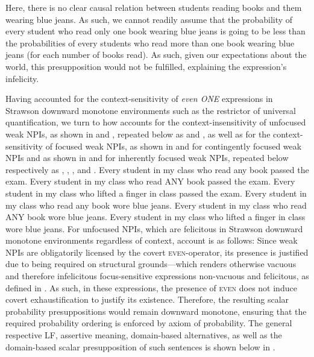 \xe
Here, there is no clear causal relation between students reading books and them wearing blue jeans. As such, we cannot readily assume that the probability of every student who read only one book wearing blue jeans is going to be less than the probabilities of every students who read more than one book wearing blue jeans (for each number of books read). As such, given our expectations about the world, this presupposition would not be fulfilled, explaining the expression's infelicity.

Having accounted for the context-sensitivity of \textit{even \MakeUppercase{one}} expressions in Strawson downward monotone environments such as the restrictor of universal quantification, we turn to how \textcite{Crnic2014-dogma} accounts for the context-insensitivity of unfocused weak NPIs, as shown in  and , repeated below as  and , as well as for the context-sensitivity of focused weak NPIs, as shown in  and  for contingently focused weak NPIs and as shown in  and  for inherently focused weak NPIs, repeated below respectively as , , , and .
\pex[nopreamble=true]\label{ex:npi-every-okay-repeat}%
\a{} Every student in my class who read any book passed the exam.
\a{} Every student in my class who read \MakeUppercase{any} book passed the exam.
\a{} Every student in my class who lifted a finger in class passed the exam.
\xe
\pex[nopreamble=true]\label{ex:npi-every-bad-repeat}%
\a{} Every student in my class who read any book wore blue jeans.
\a{}\ljudge{\#} Every student in my class who read \MakeUppercase{any} book wore blue jeans.
\a{}\ljudge{\#} Every student in my class who lifted a finger in class wore blue jeans.
\xe
For unfocused NPIs, which are felicitous in Strawson downward monotone environments regardless of context,  account is as follows: Since weak NPIs are obligatorily licensed by the covert {\scshape even}-operator, its presence is justified due to being required on structural grounds---which renders otherwise vacuous and therefore infelicitous focus-sensitive expressions non-vacuous and felicitous, as defined in . As such, in these expressions, the presence of {\scshape even} does not induce covert exhaustification to justify its existence. Therefore, the resulting scalar probability presuppositions would remain downward monotone, ensuring that the required probability ordering is enforced by  axiom of probability. The general respective LF, assertive meaning, domain-based alternatives, as well as the domain-based scalar presupposition of such sentences is shown below in .
